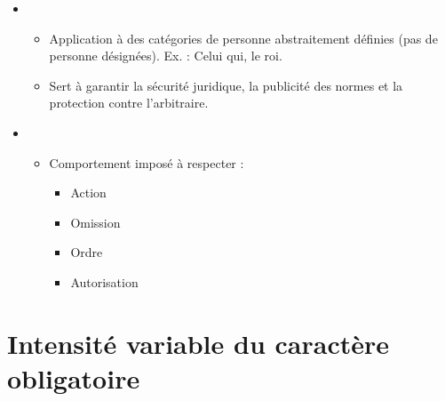 \begin{itemize}
    \item {}
        \begin{itemize}
            \item Application à des catégories de personne abstraitement définies (pas de personne désignées). Ex. : Celui qui, le roi.
            \item Sert à garantir la sécurité juridique, la publicité des normes et la protection contre l'arbitraire.
        \end{itemize}
    \item {}
        \begin{itemize}
            \item Comportement imposé à respecter :
                \begin{itemize}
                    \item Action
                    \item Omission
                    \item Ordre
                    \item Autorisation
                \end{itemize}
        \end{itemize}
\end{itemize}

\section{Intensité variable du caractère obligatoire}

